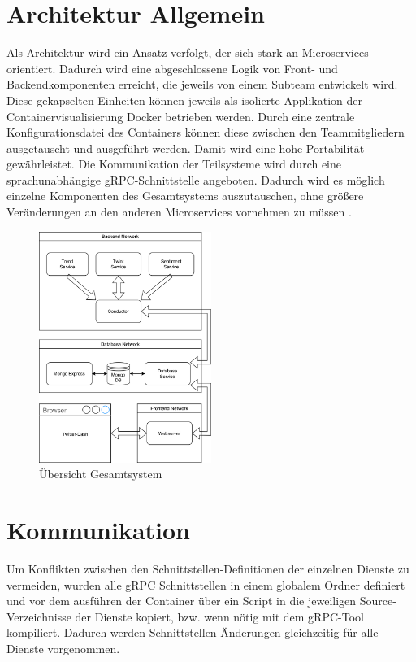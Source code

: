 \documentclass[conference]{IEEEtran}
\begin{document}
\section{Architektur Allgemein}

Als Architektur wird ein Ansatz verfolgt, der sich stark an Microservices orientiert.
Dadurch wird eine abgeschlossene Logik von Front- und Backendkomponenten erreicht, die jeweils
von einem Subteam entwickelt wird. Diese gekapselten Einheiten können jeweils als isolierte Applikation der Containervisualisierung Docker betrieben werden.
Durch eine zentrale Konfigurationsdatei des Containers können diese zwischen den Teammitgliedern
ausgetauscht und ausgeführt werden. Damit wird eine hohe Portabilität gewährleistet.
Die Kommunikation der Teilsysteme wird durch eine sprachunabhängige gRPC-Schnittstelle angeboten.
Dadurch wird es möglich einzelne Komponenten des Gesamtsystems auszutauschen,
ohne größere Veränderungen an den anderen Microservices vornehmen zu müssen \cite{microservices}.

\begin{figure}
    \includegraphics[width=0.5\textwidth]{Architecture.png}
    \caption{Übersicht Gesamtsystem}
\end{figure}


\section{Kommunikation}
Um Konflikten zwischen den Schnittstellen-Definitionen der einzelnen Dienste zu vermeiden,
wurden alle gRPC Schnittstellen in einem globalem Ordner definiert und vor  dem ausführen der Container über ein Script in die jeweiligen Source-Verzeichnisse der Dienste kopiert, bzw. wenn nötig mit dem gRPC-Tool kompiliert.
Dadurch werden Schnittstellen Änderungen gleichzeitig für alle Dienste vorgenommen.
\end{document}
